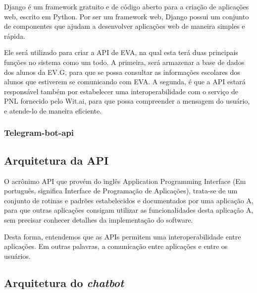 Django é um framework gratuito e de código aberto para a criação de aplicações web, escrito em Python. Por ser um framework web, Django possui um conjunto de componentes que ajudam a desenvolver aplicações web de maneira simples e rápida.

Ele será utilizado para criar a API de EVA, na qual esta terá duas principais funções no sistema como um todo. A primeira, será armazenar a base de dados dos alunos da EV.G, para que se possa consultar as informações escolares dos alunos que estiverem se comunicando com EVA. A segunda, é que a API estará responsável também por estabelecer uma interoperabilidade com o serviço de PNL fornecido pelo Wit.ai, para que possa compreender a mensagem do usuário, e atende-lo de maneira eficiente.

\subsubsection{Telegram-bot-api}


\subsection{Arquitetura da API}

O acrônimo API que provém do inglês Application Programming Interface (Em português, significa Interface de Programação de Aplicações), trata-se de um conjunto de rotinas e padrões estabelecidos e documentados por uma aplicação A, para que outras aplicações consigam utilizar as funcionalidades desta aplicação A, sem precisar conhecer detalhes da implementação do software.

Desta forma, entendemos que as APIs permitem uma interoperabilidade entre aplicações. Em outras palavras, a comunicação entre aplicações e entre os usuários.

\subsection{Arquitetura do \textit{chatbot}}